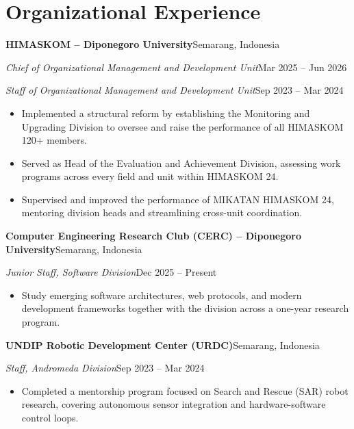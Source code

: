 \documentclass[a4paper,10pt]{article}
\newcommand{\entryhead}[2]{\textbf{#1}\hfill{#2}\par\vspace{0.15em}}
\newcommand{\role}[2]{\textit{#1}\hfill{#2}\par}
\newenvironment{bullets}
  {\begin{itemize}[leftmargin=1.1em,topsep=0.25em,itemsep=0.15em,parsep=0pt,label=\textbullet]}
  {\end{itemize}\vspace{0.1em}}
\begin{document}
\section{Organizational Experience}
\entryhead{HIMASKOM -- Diponegoro University}{Semarang, Indonesia}
\role{Chief of Organizational Management and Development Unit}{Mar 2025 -- Jun 2026}
\role{Staff of Organizational Management and Development Unit}{Sep 2023 -- Mar 2024}
\begin{bullets}
  \item Implemented a structural reform by establishing the Monitoring and Upgrading Division to oversee and raise the performance of all HIMASKOM 120+ members.
  \item Served as Head of the Evaluation and Achievement Division, assessing work programs across every field and unit within HIMASKOM 24.
  \item Supervised and improved the performance of MIKATAN HIMASKOM 24, mentoring division heads and streamlining cross-unit coordination.
\end{bullets}
\vspace{0.55em}
\entryhead{Computer Engineering Research Club (CERC) -- Diponegoro University}{Semarang, Indonesia}
\role{Junior Staff, Software Division}{Dec 2025 -- Present}
\begin{bullets}
  \item Study emerging software architectures, web protocols, and modern development frameworks together with the division across a one-year research program.
\end{bullets}
\vspace{0.55em}
\entryhead{UNDIP Robotic Development Center (URDC)}{Semarang, Indonesia}
\role{Staff, Andromeda Division}{Sep 2023 -- Mar 2024}
\begin{bullets}
  \item Completed a mentorship program focused on Search and Rescue (SAR) robot research, covering autonomous sensor integration and hardware-software control loops.
\end{bullets}
\vspace{0.55em}
\end{document}
